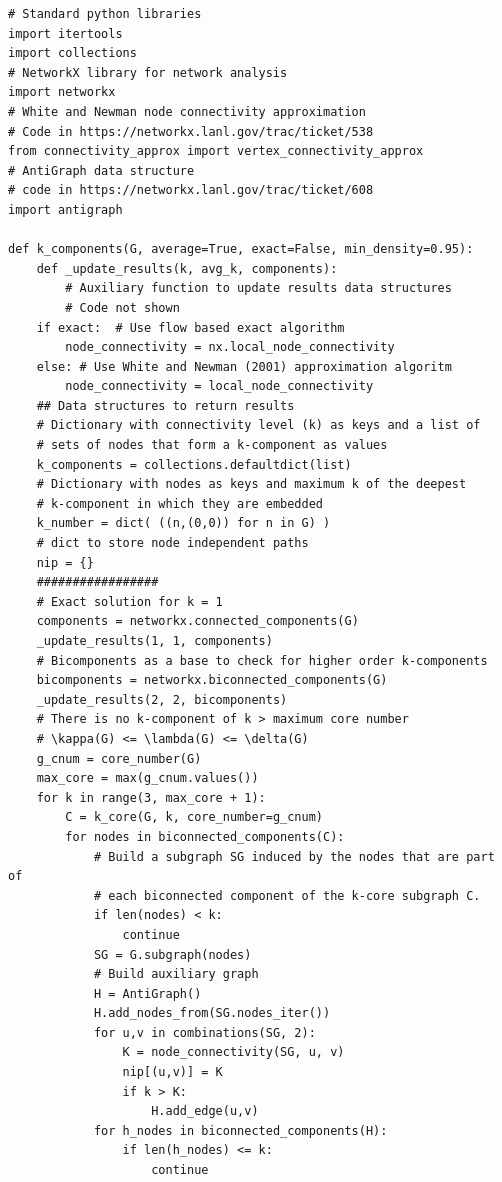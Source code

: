 \begin{footnotesize}
\begin{lstlisting}
# Standard python libraries
import itertools
import collections
# NetworkX library for network analysis
import networkx
# White and Newman node connectivity approximation
# Code in https://networkx.lanl.gov/trac/ticket/538
from connectivity_approx import vertex_connectivity_approx
# AntiGraph data structure
# code in https://networkx.lanl.gov/trac/ticket/608
import antigraph

def k_components(G, average=True, exact=False, min_density=0.95):
    def _update_results(k, avg_k, components):
        # Auxiliary function to update results data structures
        # Code not shown
    if exact:  # Use flow based exact algorithm
        node_connectivity = nx.local_node_connectivity
    else: # Use White and Newman (2001) approximation algoritm
        node_connectivity = local_node_connectivity 
    ## Data structures to return results
    # Dictionary with connectivity level (k) as keys and a list of
    # sets of nodes that form a k-component as values
    k_components = collections.defaultdict(list)
    # Dictionary with nodes as keys and maximum k of the deepest 
    # k-component in which they are embedded
    k_number = dict( ((n,(0,0)) for n in G) )
    # dict to store node independent paths
    nip = {} 
    #################
    # Exact solution for k = 1
    components = networkx.connected_components(G)
    _update_results(1, 1, components)
    # Bicomponents as a base to check for higher order k-components
    bicomponents = networkx.biconnected_components(G)
    _update_results(2, 2, bicomponents)
    # There is no k-component of k > maximum core number
    # \kappa(G) <= \lambda(G) <= \delta(G)
    g_cnum = core_number(G)
    max_core = max(g_cnum.values())
    for k in range(3, max_core + 1):
        C = k_core(G, k, core_number=g_cnum)
        for nodes in biconnected_components(C):
            # Build a subgraph SG induced by the nodes that are part of
            # each biconnected component of the k-core subgraph C.
            if len(nodes) < k:
                continue
            SG = G.subgraph(nodes)
            # Build auxiliary graph
            H = AntiGraph()
            H.add_nodes_from(SG.nodes_iter())
            for u,v in combinations(SG, 2):
                K = node_connectivity(SG, u, v)
                nip[(u,v)] = K
                if k > K:
                    H.add_edge(u,v)
            for h_nodes in biconnected_components(H):
                if len(h_nodes) <= k:
                    continue

\end{lstlisting}
\end{footnotesize}
